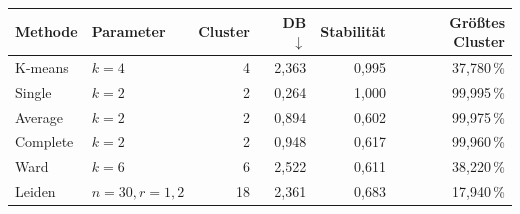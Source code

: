 \begin{tabular}{@{}llrrrr@{}}
\toprule
Methode & Parameter & Cluster & DB $\downarrow$ & Stabilität & Größtes Cluster\\
\midrule
K-means & $k=4$ & 4 & 2{,}363 & 0{,}995 & 37{,}780\,\% \\
Single & $k=2$ & 2 & 0{,}264 & 1{,}000 & 99{,}995\,\% \\
Average & $k=2$ & 2 & 0{,}894 & 0{,}602 & 99{,}975\,\% \\
Complete & $k=2$ & 2 & 0{,}948 & 0{,}617 & 99{,}960\,\% \\
Ward & $k=6$ & 6 & 2{,}522 & 0{,}611 & 38{,}220\,\% \\
Leiden & $n=30, r=1{,}2$ & 18 & 2{,}361 & 0{,}683 & 17{,}940\,\% \\
\bottomrule
\end{tabular}
